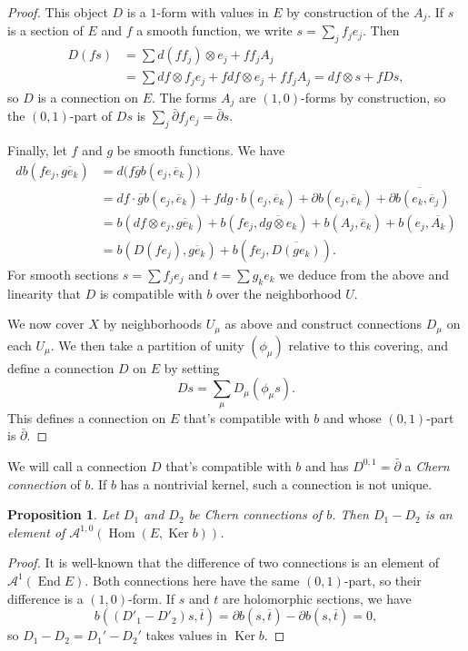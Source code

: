 \documentclass[10pt,a4paper]{amsart}
\newtheorem{prop}[theo]{Proposition}
\theoremstyle{definition}
\newcommand{\cc}[1]{\mathcal{#1}}
\def\ov#1{\overline{#1}}
\DeclareMathOperator{\Ker}{Ker}
\DeclareMathOperator{\End}{End}
\DeclareMathOperator{\Hom}{Hom}
\begin{document}
\begin{proof}
This object $D$ is a $1$-form with values in $E$ by construction of the $A_j$. If $s$ is a section of $E$ and $f$ a smooth function, we write $s = \sum_j f_j e_j$. Then
\begin{align*}
D(fs)
&= \sum d(f f_j) \otimes e_j + f f_j A_j
\\
&= \sum df \otimes f_j e_j + f df \otimes e_j + f f_j A_j
= df \otimes s + f Ds,
\end{align*}
so $D$ is a connection on $E$. The forms $A_j$ are $(1,0)$-forms by construction, so the $(0,1)$-part of $Ds$ is $\sum_j \bar\partial f_j e_j = \bar\partial s$.

Finally, let $f$ and $g$ be smooth functions. We have
\begin{align*}
d b(fe_j, \ov{ge_k})
&= d\bigl(f \ov g b(e_j, \ov e_k) \bigr)
\\
&= df \cdot \ov g b(e_j, \ov e_k)
+ f dg \cdot b(e_j, \ov e_k)
+ \partial b(e_j, \ov e_k)
+ \ov{\partial b(e_k, \ov e_j)}
\\
&= b(df \otimes e_j, \ov{ge_k})
+ b(f e_j, \ov{dg \otimes e_k})
+ b(A_j, \ov e_k)
+ b(e_j, \ov{A_k})
\\
&= b(D(f e_j), \ov{ge_k}) + b(f e_j, \ov{D(g e_k)}).
\end{align*}
For smooth sections $s = \sum f_j e_j$ and $t = \sum g_k e_k$ we deduce from the above and linearity that $D$ is compatible with $b$ over the neighborhood $U$.

We now cover $X$ by neighborhoods $U_\mu$ as above and construct connections $D_\mu$ on each $U_\mu$. We then take a partition of unity $(\phi_\mu)$ relative to this covering, and define a connection $D$ on $E$ by setting
\[
D s = \sum_\mu D_\mu(\phi_\mu s).
\]
This defines a connection on $E$ that's compatible with $b$ and whose $(0,1)$-part is $\bar\partial$.
\end{proof}



We will call a connection $D$ that's compatible with $b$ and has $D^{0,1} = \bar\partial$ a \emph{Chern connection} of $b$. If $b$ has a nontrivial kernel, such a connection is not unique.


\begin{prop}
Let $D_1$ and $D_2$ be Chern connections of $b$. Then $D_1 - D_2$ is an element of $\cc A^{1,0}(\Hom(E, \Ker b))$.
\end{prop}

\begin{proof}
It is well-known that the difference of two connections is an element of $\cc A^1(\End E)$. Both connections here have the same $(0,1)$-part, so their difference is a $(1,0)$-form. If $s$ and $t$ are holomorphic sections, we have
\[
b((D'_1 - D'_2)s, \ov t)
= \partial b(s, \ov t) - \partial b(s, \ov t) = 0,
\]
so $D_1 - D_2 = D_1' - D_2'$ takes values in $\Ker b$.
\end{proof}
\end{document}
